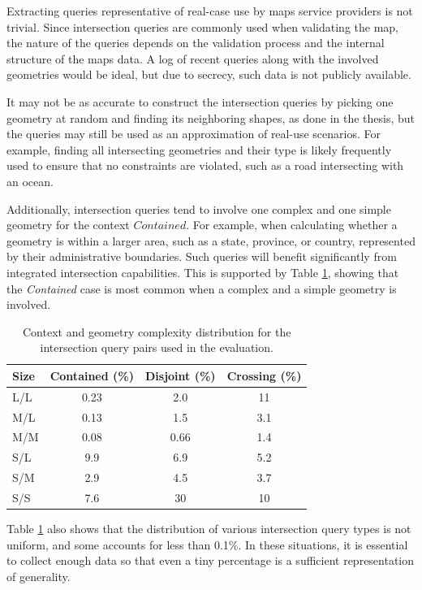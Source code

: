 Extracting queries representative of real-case use by maps service providers is not trivial. Since intersection queries are commonly used when validating the map, the nature of the queries depends on the validation process and the internal structure of the maps data. A log of recent queries along with the involved geometries would be ideal, but due to secrecy, such data is not publicly available.

It may not be as accurate to construct the intersection queries by picking one geometry at random and finding its neighboring shapes, as done in the thesis, but the queries may still be used as an approximation of real-use scenarios. For example, finding all intersecting geometries and their type is likely frequently used to ensure that no constraints are violated, such as a road intersecting with an ocean.

Additionally, intersection queries tend to involve one complex and one simple geometry for the context \(Contained\). For example, when calculating whether a geometry is within a larger area, such as a state, province, or country, represented by their administrative boundaries. Such queries will benefit significantly from integrated intersection capabilities. This is supported by Table \ref{tab:context_distribution}, showing that the \textit{Contained} case is most common when a complex and a simple geometry is involved.

\begin{table}[H]
\centering
\begin{tabular}{lccc}
\hline
Size & Contained (\%) & Disjoint (\%) & Crossing (\%) \\
\hline
L/L & 0.23 & 2.0 & 11 \\
M/L & 0.13 & 1.5 & 3.1 \\
M/M & 0.08 & 0.66 & 1.4 \\
S/L & 9.9 & 6.9 & 5.2 \\
S/M & 2.9 & 4.5 & 3.7 \\
S/S & 7.6 & 30 & 10 \\
\hline
\end{tabular}

\caption{Context and geometry complexity distribution for the intersection query pairs used in the evaluation.}
\label{tab:context_distribution}
\end{table}

Table \ref{tab:context_distribution} also shows that the distribution of various intersection query types is not uniform, and some accounts for less than 0.1\%. In these situations, it is essential to collect enough data so that even a tiny percentage is a sufficient representation of generality.


